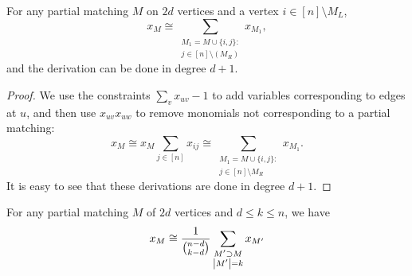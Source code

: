 \begin{lemma}
  \label{lem:tsp+a}
  For any partial matching \(M\) on \(2d\) vertices
  and a vertex \(i \in [n] \setminus M_L\),
  \begin{equation}
    \label{eq:tsp+a}
    x_{M}
    \cong
    \sum_{\substack{M_{1} = M \cup \{i,j\}: \\
        j \in [n] \setminus (M_R)}}
    x_{M_{1}}
    ,
  \end{equation}
	and the derivation can be done in degree $d+1$.
\end{lemma}
\begin{proof}
We use the constraints \(\sum_{v} x_{uv} - 1\)
to add variables corresponding to edges at \(u\),
and then use \(x_{uv} x_{uw}\) to remove monomials
not corresponding to a partial matching:
\begin{equation*}
  x_{M}
  \cong
  x_{M} \sum_{j \in [n]} x_{ij}
  \cong
  \sum_{\substack{M_{1} = M \cup \{i,j\}: \\
      j \in [n] \setminus M_R}}
  x_{M_{1}}
  .
\end{equation*}
It is easy to see that these derivations are done in degree $d+1$.
\end{proof}
\begin{lemma}
  \label{lem:tsp-partial-matching}
  For any partial matching \(M\) of \(2d\) vertices
  and \(d \leq k \leq n\),
  we have
  \begin{equation}
    \label{eq:tsp-partial-matching}
    x_{M} \cong
    \frac{1}{\binom{n - d}{k - d}}
    \sum_{\substack{M' \supset M \\ \left|M'\right| = k}} x_{M'}
  \end{equation}
\end{lemma}
